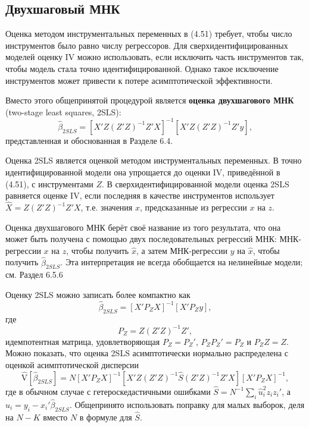 \subsection{Двухшаговый МНК}

Оценка методом инструментальных переменных в (4.51) требует, чтобы число инструментов было равно числу регрессоров. Для сверхидентифицированных моделей оценку IV можно использовать, если исключить часть инструментов так, чтобы модель стала точно идентифицированной. Однако такое исключение инструментов может привести к потере асимптотической эффективности.

Вместо этого общепринятой процедурой является \textbf{оценка двухшагового МНК} (two-stage least squares, 2SLS):
\begin{equation}
\hat{\beta}_{2SLS} = [X'Z(Z'Z)^{-1}Z'X]^{-1}[X'Z(Z'Z)^{-1}Z'y],
\end{equation}
представленная и обоснованная в Разделе 6.4.

Оценка 2SLS является оценкой методом инструментальных переменных. В точно идентифицированной модели она упрощается до оценки IV, приведённой в (4.51), с инструментами $Z$. В сверхидентифицированной модели оценка 2SLS равняется оценке IV, если последняя в качестве инструментов использует $\hat{X}=Z(Z'Z)^{-1}Z'X$, т.е. значения $x$, предсказанные из регрессии $x$ на $z$.

Оценка двухшагового МНК берёт своё название из того результата, что она может быть получена с помощью двух последовательных регрессий МНК: МНК-регрессии $x$ на $z$, чтобы получить $\hat{x}$, а затем МНК-регрессии $y$ на $\hat{x}$, чтобы получить $\hat{\beta}_{2SLS}$. Эта интерпретация не всегда обобщается на нелинейные модели; см. Раздел 6.5.6

Оценку 2SLS можно записать более компактно как 
\begin{equation}
\hat{\beta}_{2SLS} = [X'P_ZX]^{-1}[X'P_Zy],
\end{equation}
где
$$
P_Z = Z(Z'Z)^{-1}Z',
$$
идемпотентная матрица, удовлетворяющая $P_Z = P_Z'$, $P_Z P_Z' = P_Z$ и $P_Z Z = Z$. Можно показать, что оценка 2SLS асимптотически нормально распределена с оценкой асимптотической дисперсии
\begin{equation}
\hat{\mathrm{V}}[\hat{\beta}_{2SLS}] =N[X'P_ZX]^{-1}[X'Z(Z'Z)^{-1}\hat{S}(Z'Z)^{-1}Z'X][X'P_ZX]^{-1},
\end{equation}
где в обычном случае с гетероскедастичными ошибками $\hat{S} = N^{-1}\sum_i\hat{u}_i^2 z_i z_i'$, а $\hat{u}_i = y_i - x_i'\hat{\beta}_{2SLS}$. Общепринято использовать поправку для малых выборок, деля на $N-K$ вместо $N$ в формуле для $\hat{S}$.


